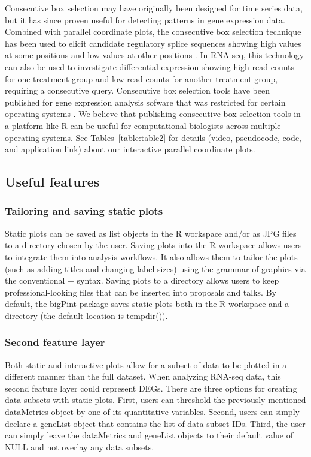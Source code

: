 \documentclass[parskip=full]{bmcart}
\begin{document}
Consecutive box selection may have originally been designed for time series data, but it has since proven useful for detecting patterns in gene expression data. Combined with parallel coordinate plots, the consecutive box selection technique has been used to elicit candidate regulatory splice sequences showing high values at some positions and low values at other positions \cite{hochheiser2003dynamic}. In RNA-seq, this technology can also be used to investigate differential expression showing high read counts for one treatment group and low read counts for another treatment group, requiring a consecutive query. Consecutive box selection tools have been published for gene expression analysis sofware that was restricted for certain operating systems \cite{hochheiser2003dynamic}. We believe that publishing consecutive box selection tools in a platform like R can be useful for computational biologists across multiple operating systems. See Tables~\ref{table:table2} for details (video, pseudocode, code, and application link) about our interactive parallel coordinate plots.

\subsection*{Useful features}

\subsubsection*{Tailoring and saving static plots}

Static plots can be saved as list objects in the R workspace and/or as JPG files to a directory chosen by the user. Saving plots into the R workspace allows users to integrate them into analysis workflows. It also allows them to tailor the plots (such as adding titles and changing label sizes) using the grammar of graphics via the conventional + syntax. Saving plots to a directory allows users to keep professional-looking files that can be inserted into proposals and talks. By default, the bigPint package saves static plots both in the R workspace and a directory (the default location is tempdir()).

\subsubsection*{Second feature layer}

Both static and interactive plots allow for a subset of data to be plotted in a different manner than the full dataset. When analyzing RNA-seq data, this second feature layer could represent DEGs. There are three options for creating data subsets with static plots. First, users can threshold the previously-mentioned dataMetrics object by one of its quantitative variables. Second, users can simply declare a geneList object that contains the list of data subset IDs. Third, the user can simply leave the dataMetrics and geneList objects to their default value of NULL and not overlay any data subsets.
\end{document}
